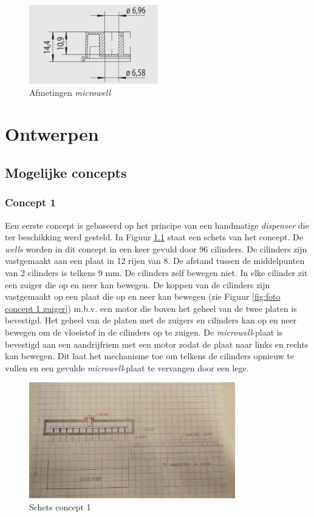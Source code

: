 \documentclass[a4paper,twoside,kulak]{kulakreport} %
\begin{document}
\begin{figure}[h]
	\centering
	\includegraphics[width=0.5\textwidth]{AfmetingenMicrowell.png}
	\caption{Afmetingen \textit{microwell}}
	\label{fig: afmetingenMicrowellplaat}
	
\end{figure} 


\chapter{Ontwerpen} 
\section{Mogelijke concepts}
\subsection{Concept 1}
Een eerste concept is gebaseerd op het principe van een handmatige \textit{dispenser} die ter beschikking werd gesteld. In Figuur \ref{fig: schets concept 1} staat een schets van het concept. De \textit{wells} worden in dit concept in een keer gevuld door 96 cilinders. De cilinders zijn vastgemaakt aan een plaat in 12 rijen van 8. De afstand tussen de middelpunten van 2 cilinders is telkens 9 mm. De cilinders zelf bewegen niet. In elke cilinder zit een zuiger die op en neer kan bewegen. De koppen van de cilinders zijn vastgemaakt op een plaat die op en neer kan bewegen (zie Figuur \ref{fig:foto concept 1 zuiger}) m.b.v. een motor die boven het geheel van de twee platen is bevestigd. Het geheel van de platen met de zuigers en cilinders kan op en neer bewegen om de vloeistof in de cilinders op te zuigen. De \textit{microwell}-plaat is bevestigd aan een aandrijfriem met een motor zodat de plaat naar links en rechts kan bewegen. Dit laat het mechanisme toe om telkens de cilinders opnieuw te vullen en een gevulde \textit{microwell}-plaat te vervangen door een lege.  

\begin{figure}[h]
	\centering
	\includegraphics[width=0.8\textwidth]{fotoConcept1.jpg}
	\caption{Schets concept 1}
	\label{fig: schets concept 1}
	
\end{figure} 
\end{document}
